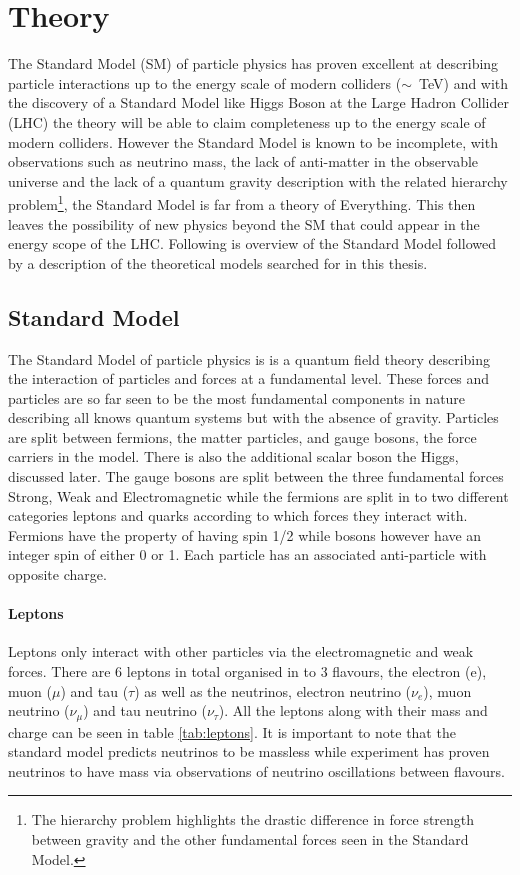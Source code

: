\chapter{Theory}

    The Standard Model (SM) of particle physics has proven excellent at describing particle interactions up to the energy scale of modern colliders ($\sim$~TeV) and with the discovery of a Standard Model like Higgs Boson at the Large Hadron Collider (LHC) the theory will be able to claim completeness up to the energy scale of modern colliders. However the Standard Model is known to be incomplete, with observations such as neutrino mass, the lack of anti-matter in the observable universe and the lack of a quantum gravity description with the related hierarchy problem\footnote{The hierarchy problem highlights the drastic difference in force strength between gravity and the other fundamental forces seen in the Standard Model.}, the Standard Model is far from a theory of Everything. This then leaves the possibility of new physics beyond the SM that could appear in the energy scope of the LHC.
    Following is overview of the Standard Model \cite{ulrik:GriffEP2008} followed by a description of the theoretical models searched for in this thesis. 

\section{Standard Model}
    
    The Standard Model of particle physics is is a quantum field theory describing the interaction of particles and forces at a fundamental level. These forces and particles are so far seen to be the most fundamental components in nature describing all knows quantum systems but with the absence of gravity. Particles are split between fermions, the matter particles, and gauge bosons, the force carriers in the model. There is also the additional scalar boson the Higgs, discussed later. The gauge bosons are split between the three fundamental forces Strong, Weak and Electromagnetic while the fermions are split in to two different categories leptons and quarks according to which forces they interact with. Fermions have the property of having spin 1/2 while bosons however have an integer spin of either 0 or 1. Each particle has an associated anti-particle with opposite charge. 

    \subsubsection*{Leptons}
    Leptons only interact with other particles via the electromagnetic and weak forces. There are 6 leptons in total organised in to 3 flavours, the electron (e), muon ($\mu$) and tau ($\tau$) as well as the neutrinos, electron neutrino ($\nu_{e}$), muon neutrino ($\nu_{\mu}$) and tau neutrino ($\nu_{\tau}$). All the leptons along with their mass and charge can be seen in table \ref{tab:leptons}. It is important to note that the standard model predicts neutrinos to be massless while experiment has proven neutrinos to have mass via observations of neutrino oscillations between flavours. 


